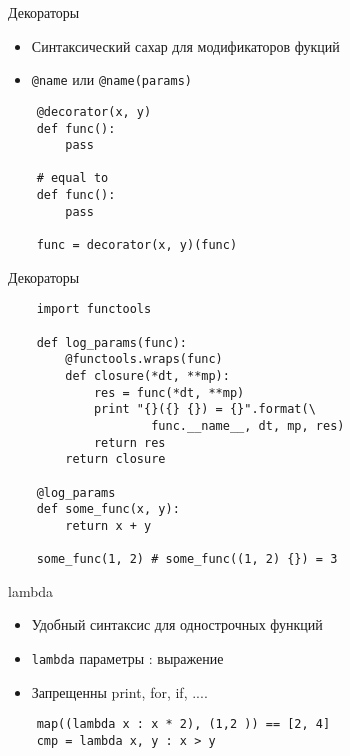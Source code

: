 \documentclass{article}
\begin{document}
\begin{center} Декораторы \end{center}
\begin{itemize}
    \item Синтаксический сахар для модификаторов фукций
    \item \lstinline!@name! или \lstinline!@name(params)!
\end{itemize}
\vspace{15pt}
\begin{lstlisting}
    @decorator(x, y)
    def func():
        pass

    # equal to
    def func():
        pass

    func = decorator(x, y)(func)
\end{lstlisting}
\newpage

\begin{center} Декораторы \end{center}
\vspace{15pt}
\begin{lstlisting}
    import functools

    def log_params(func):
        @functools.wraps(func)
        def closure(*dt, **mp):
            res = func(*dt, **mp)
            print "{}({} {}) = {}".format(\
                    func.__name__, dt, mp, res)
            return res
        return closure

    @log_params
    def some_func(x, y):
        return x + y

    some_func(1, 2) # some_func((1, 2) {}) = 3
\end{lstlisting}
\newpage

\begin{center} lambda \end{center}
\begin{itemize}
    \item Удобный синтаксис для однострочных функций
    \item \lstinline!lambda! параметры : выражение
    \item Запрещенны print, for, if, ....
\end{itemize}
\vspace{15pt}
\begin{lstlisting}
    map((lambda x : x * 2), (1,2 )) == [2, 4]
    cmp = lambda x, y : x > y
\end{lstlisting}
\newpage
\end{document}
